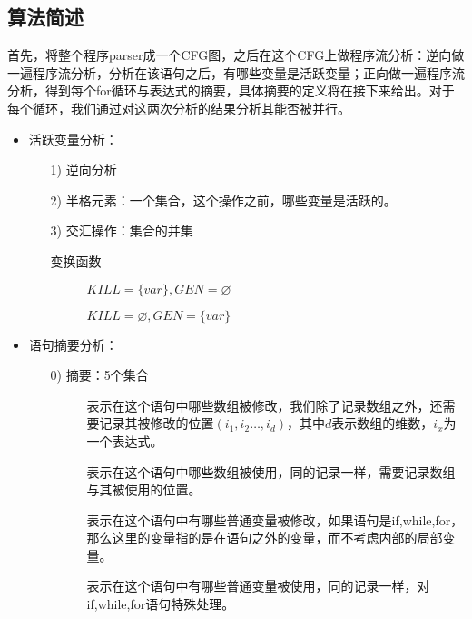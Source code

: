 \documentclass[12pt]{article}
\begin{document}
		\subsection{算法简述}
			首先，将整个程序parser成一个CFG图，之后在这个CFG上做程序流分析：逆向做一遍程序流分析，分析在该语句之后，有哪些变量是活跃变量；正向做一遍程序流分析，得到每个for循环与表达式的摘要，具体摘要的定义将在接下来给出。对于每个循环，我们通过对这两次分析的结果分析其能否被并行。\\
			\begin{itemize}
				\item 活跃变量分析：
				\begin{itemize}
					\item[1)] 逆向分析
					\item[2)] 半格元素：一个集合，这个操作之前，哪些变量是活跃的。
					\item[3)] 交汇操作：集合的并集
					\begin{item}[4)] 
						变换函数\\
						\begin{description}
							\item[]
								$KILL=\{var\},GEN=\varnothing$
							\item[]
								$KILL=\varnothing,GEN=\{var\}$
						\end{description}
					\end{item}
				\end{itemize}
				\item 语句摘要分析：
				\begin{itemize} 
					\item[0)] 摘要：5个集合\\
						\begin{description}
							\item[]
								表示在这个语句中哪些数组被修改，我们除了记录数组之外，还需要记录其被修改的位置$(i_1,i_2\dots ,i_d)$，其中$d$表示数组的维数，$i_x$为一个表达式。
							\item[]
								表示在这个语句中哪些数组被使用，同的记录一样，需要记录数组与其被使用的位置。
							\item[]
								表示在这个语句中有哪些普通变量被修改，如果语句是if,while,for，那么这里的变量指的是在语句之外的变量，而不考虑内部的局部变量。
							\item[]
								表示在这个语句中有哪些普通变量被使用，同的记录一样，对if,while,for语句特殊处理。

\end{description}
\end{itemize}
\end{itemize}
\end{document}
